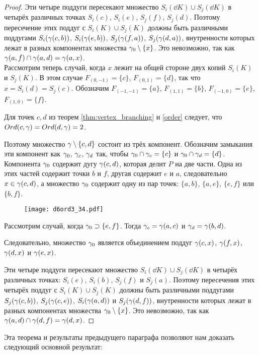 \begin{proof}
Эти четыре поддуги пересекают множество $S_i(\dd K)\cup S_j(\dd K)$ в четырёх различных точках $S_i(c)$, $S_i(e)$, $S_j(f)$, $S_j(d)$. 
Поэтому пересечение этих поддуг с $S_i( K)\cup S_j(K)$ должны быть различными поддугами $S_i(\gamma(c,b))$,  $S_i(\gamma(e,b))$, $S_j(\gamma(f,a))$, $S_j(\gamma(d,a))$, внутренности которых лежат в разных компонентах множества $\gamma_0\setminus\{x\}$. 
Это невозможно, так как $\gamma(a,f)\cap\gamma(a,d)=\gamma(a,x)$.\\

Рассмотрим теперь случай, когда $x$ лежит на общей стороне двух копий $S_i(K)$ и $S_j(K)$. 
В этом случае $F_{(0,-1)}=\{c\}$, $F_{(0,1)}=\{d\}$, так что $x=S_i(d)=S_j(c)$.  
Обозначим $F_{(-1,-1)}=\{a\}$, $F_{(1 ,1)}=\{b\}$, $F_{(-1,0)}=\{e\}$, $F_{(1,0)}=\{f\}$.

Для точек $c,d$ из теорем \ref{thm:vertex_branching} и \ref{order} следует, что $Ord(c,\gamma)=Ord(d,\gamma)=2$. 

Поэтому множество $\gamma\setminus\{c,d\}$  состоит из трёх компонент. 
Обозначим замыкания эти компонент как $\gamma_0$, $\gamma_c$, $\gamma_d$ так, чтобы $\gamma_0\cap\gamma_c=\{c\}$ и $\gamma_0\cap \gamma_d=\{d\}$. 
Компонента $\gamma_0$ содержит дугу $\gamma(c,d)$, которая делит $P$ на две части. 
Одна из этих частей содержит точки $b$ и $f$, другая содержит $e$ и $a$, следовательно $x\in \gamma(c,d)$, а множество $\gamma_0$ содержит одну из пар точек: $\{a,b\}$, $\{a,e\}$, $\{e,f\}$ или $\{b,f\}$. 

\begin{figure}[H]
    \centering
    \texttt{[image: d6ord3\_34.pdf]}
\end{figure}

Рассмотрим случай, когда $\gamma_0\supset\{e,f\}$. 
Тогда $\gamma_c=\gamma(a,c)$ и $\gamma_d=\gamma(b,d)$.

Следовательно, множество $\gamma_0$ является объединением поддуг  $\gamma(c,x)$, $\gamma(f,x)$, $\gamma(d,x)$ и $\gamma(e,x)$.

Эти четыре поддуги пересекают множество $S_i(\dd K)\cup S_j(\dd K)$ в четырёх различных точках: $S_i(e)$, $S_i(b)$, $S_j(f)$ и $S_j(a)$. 
Поэтому пересечения этих четырёх поддуг с $S_i( K)\cup S_j(K)$ должны быть различными поддугами $S_j(\gamma(c,b))$, $S_j(\gamma(c,e))$, $S_i(\gamma(a,d))$ и $S_j(\gamma(d,f))$, внутренности которых лежат в разных компонентах множества $\gamma_0\setminus\{x\}$. 
Это невозможно, так как $\gamma(a,d)\cap\gamma(d,f)=\gamma(d,x)$.
\end{proof}

Эта теорема и результаты предыдущего параграфа позволяют нам доказать следующий основной результат:

